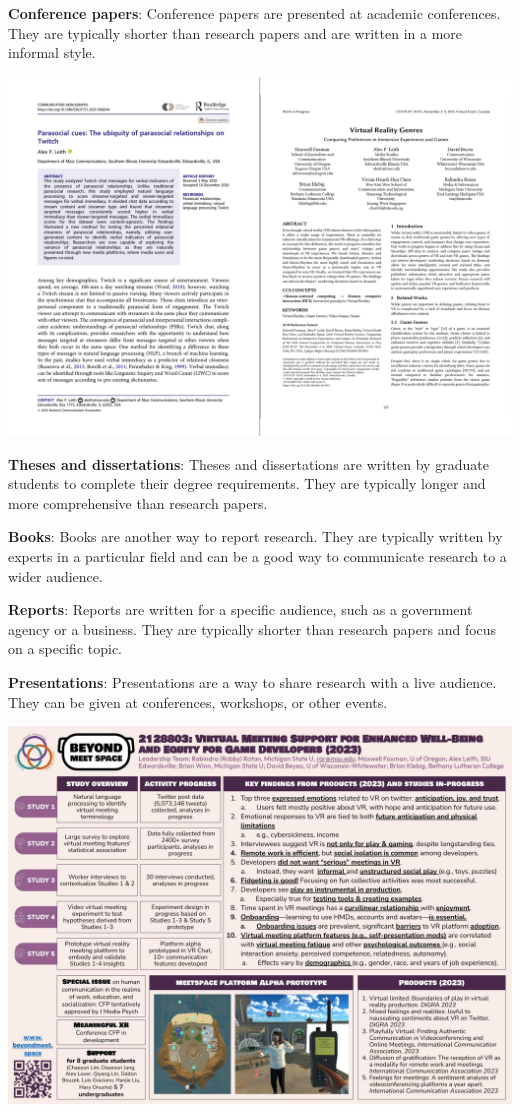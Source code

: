 \documentclass[
  b5paper]{book}
\begin{document}
\textbf{Conference papers}: Conference papers are presented at academic conferences. They are typically shorter than research papers and are written in a more informal style.

\includegraphics[width=1\textwidth,height=\textheight]{images/papers.png}

\textbf{Theses and dissertations}: Theses and dissertations are written by graduate students to complete their degree requirements. They are typically longer and more comprehensive than research papers.

\textbf{Books}: Books are another way to report research. They are typically written by experts in a particular field and can be a good way to communicate research to a wider audience.

\textbf{Reports}: Reports are written for a specific audience, such as a government agency or a business. They are typically shorter than research papers and focus on a specific topic.

\textbf{Presentations}: Presentations are a way to share research with a live audience. They can be given at conferences, workshops, or other events.

\includegraphics[width=1\textwidth,height=\textheight]{images/BMS 2023 poster final.jpg}
\end{document}
